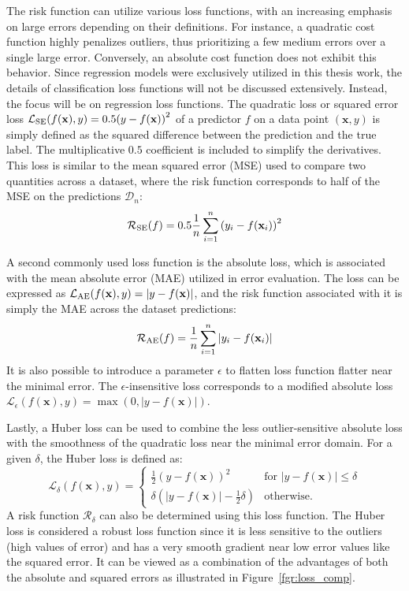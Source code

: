 \documentclass[main]{subfiles}
\begin{document}
The risk function can utilize various loss functions, with an increasing emphasis on large errors depending on their definitions. For instance, a quadratic cost function highly penalizes outliers, thus prioritizing a few medium errors over a single large error. Conversely, an absolute cost function does not exhibit this behavior. Since regression models were exclusively utilized in this thesis work, the details of classification loss functions will not be discussed extensively. Instead, the focus will be on regression loss functions. The quadratic loss or squared error loss $\mathcal{L}_{\text{SE}}(f(\mathbf{x}),y)=0.5{\left(y-f(\mathbf{x})\right)}^2$ of a predictor $f$ on a data point $(\mathbf{x},y)$ is simply defined as the squared difference between the prediction and the true label. The multiplicative $0.5$ coefficient is included to simplify the derivatives. This loss is similar to the mean squared error (MSE) used to compare two quantities across a dataset, where the risk function corresponds to half of the MSE on the predictions $\mathcal{D}_n$:
\begin{equation}
  \mathcal{R}_{\text{SE}}(f) = 0.5\frac{1}{n}\sum_{i=1}^n {\left(y_i-f(\mathbf{x}_i)\right)}^2
\end{equation}

A second commonly used loss function is the absolute loss, which is associated with the mean absolute error (MAE) utilized in error evaluation. The loss can be expressed as $\mathcal{L}_{\text{AE}}(f(\mathbf{x}),y)=\left|y-f(\mathbf{x})\right|$, and the risk function associated with it is simply the MAE across the dataset predictions:
\begin{equation}
  \mathcal{R}_{\text{AE}}(f) = \frac{1}{n}\sum_{i=1}^n \left|y_i-f(\mathbf{x}_i)\right|
\end{equation}
It is also possible to introduce a parameter $\epsilon$ to flatten loss function flatter near the minimal error. The $\epsilon$-insensitive loss corresponds to a modified absolute loss $\mathcal{L}_{\epsilon}(f(\mathbf{x}),y)=\max\left(0,\left|y-f(\mathbf{x})\right|\right)$.

Lastly, a Huber loss can be used to combine the less outlier-sensitive absolute loss with the smoothness of the quadratic loss near the minimal error domain. For a given $\delta$, the Huber loss is defined as:
\begin{equation}
  \mathcal{L}_{\delta}(f(\mathbf{x}),y) = \left\{
    \begin{array}{ll}
        \tfrac{1}{2}{\left(y-f(\mathbf{x})\right)}^2 & \mbox{for } \left|y-f(\mathbf{x})\right| \leq \delta \\
        \delta\left(\left|y-f(\mathbf{x})\right| - \tfrac{1}{2}\delta\right) & \mbox{otherwise.}
    \end{array}
  \right.
\end{equation}
A risk function $\mathcal{R}_{\delta}$ can also be determined using this loss function. The Huber loss is considered a robust loss function since it is less sensitive to the outliers (high values of error) and has a very smooth gradient near low error values like the squared error. It can be viewed as a combination of the advantages of both the absolute and squared errors as illustrated in Figure~\ref{fgr:loss_comp}.
\end{document}
